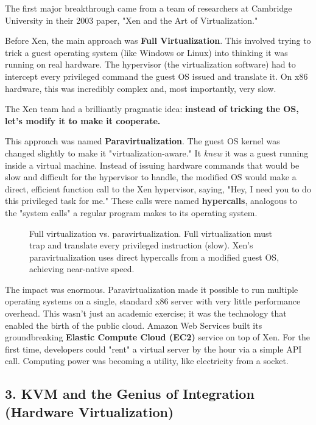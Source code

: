 The first major breakthrough came from a team of researchers at Cambridge University in their 2003 paper, "Xen and the Art of Virtualization."

Before Xen, the main approach was \textbf{Full Virtualization}. This involved trying to trick a guest operating system (like Windows or Linux) into thinking it was running on real hardware. The hypervisor (the virtualization software) had to intercept every privileged command the guest OS issued and translate it. On x86 hardware, this was incredibly complex and, most importantly, very slow.

The Xen team had a brilliantly pragmatic idea: \textbf{instead of tricking the OS, let's modify it to make it cooperate.}

This approach was named \textbf{Paravirtualization}. The guest OS kernel was changed slightly to make it "virtualization-aware." It \textit{knew} it was a guest running inside a virtual machine. Instead of issuing hardware commands that would be slow and difficult for the hypervisor to handle, the modified OS would make a direct, efficient function call to the Xen hypervisor, saying, "Hey, I need you to do this privileged task for me." These calls were named \textbf{hypercalls}, analogous to the "system calls" a regular program makes to its operating system.

\begin{figure}[htbp]
\centering

\caption{Full virtualization vs. paravirtualization. Full virtualization must trap and translate every privileged instruction (slow). Xen's paravirtualization uses direct hypercalls from a modified guest OS, achieving near-native speed.}
\label{fig:3_2}
\end{figure}


The impact was enormous. Paravirtualization made it possible to run multiple operating systems on a single, standard x86 server with very little performance overhead. This wasn't just an academic exercise; it was the technology that enabled the birth of the public cloud. Amazon Web Services built its groundbreaking \textbf{Elastic Compute Cloud (EC2)} service on top of Xen. For the first time, developers could "rent" a virtual server by the hour via a simple API call. Computing power was becoming a utility, like electricity from a socket.


\subsection{3. KVM and the Genius of Integration (Hardware Virtualization)}


